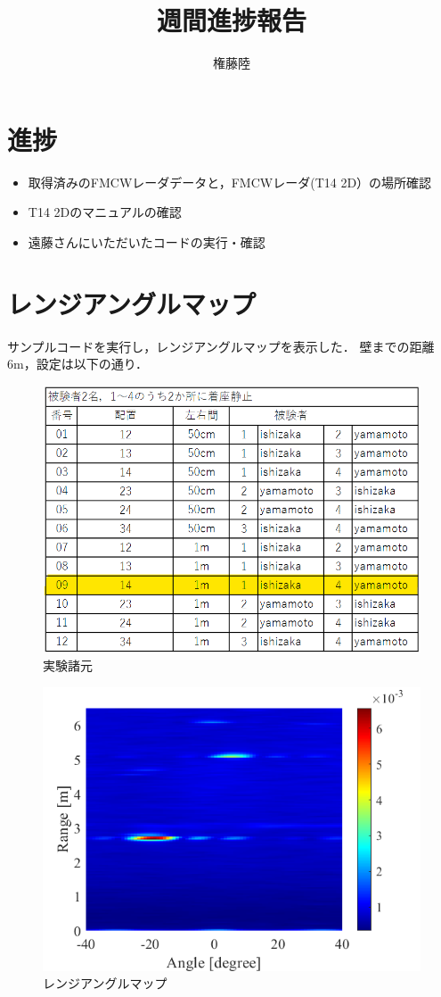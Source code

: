 \documentclass[dvipdfmx]{jsarticle}
\begin{document}
\title{週間進捗報告}
\author{権藤陸}
\maketitle
\section{進捗}
\begin{itemize}
    \item 取得済みのFMCWレーダデータと，FMCWレーダ(T14 2D）の場所確認
    \item T14 2Dのマニュアルの確認
    \item 遠藤さんにいただいたコードの実行・確認
\end{itemize}
\section{レンジアングルマップ}
サンプルコードを実行し，レンジアングルマップを表示した．
壁までの距離6m，設定は以下の通り．
\begin{figure}[htbp]
\begin{center}
\includegraphics[width=0.6\linewidth]{./img/setting.png}
\end{center}
\caption{実験諸元}
\end{figure}

\begin{figure}[H]
\begin{center}
\includegraphics[width=0.8\linewidth]{./img/range_doppler_sample.png}
\end{center}
\caption{レンジアングルマップ}
\end{figure}
\end{document}
